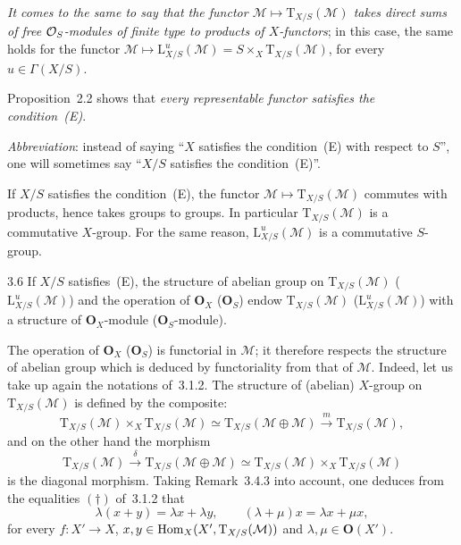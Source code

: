 \label{II.3.5.1}
\emph{It comes to the same to say that the functor
\(\mathcal{M}\mapsto\mathrm{T}_{X/S}(\mathcal{M})\) takes direct sums of free
\(\mathcal{O}_S\)-modules of finite type to products of \(X\)-functors};%
{\renewcommand{\thefootnote}{(23)}}
in this case, the same holds for the functor
\(\mathcal{M}\mapsto\mathrm{L}^{u}_{X/S}(\mathcal{M})
=S\times_X\mathrm{T}_{X/S}(\mathcal{M})\),
for every \(u\in\Gamma(X/S)\).

Proposition~2.2 shows that \emph{every representable functor satisfies the
condition~(E)}.

\emph{Abbreviation}: instead of saying ``\(X\) satisfies the condition~(E)
with respect to \(S\)'', one will sometimes say ``\(X/S\) satisfies the
condition~(E)''.

If \(X/S\) satisfies the condition~(E), the functor
\(\mathcal{M}\mapsto\mathrm{T}_{X/S}(\mathcal{M})\) commutes with products,
hence takes groups to groups. In particular
\(\mathrm{T}_{X/S}(\mathcal{M})\) is a commutative \(X\)-group. For the same
reason, \(\mathrm{L}^{u}_{X/S}(\mathcal{M})\) is a commutative \(S\)-group.

\begin{proposition}{3.6}
\label{II.3.6}
If \(X/S\) satisfies~(E), the structure of abelian group on
\(\mathrm{T}_{X/S}(\mathcal{M})\)
(\resp \(\mathrm{L}^{u}_{X/S}(\mathcal{M})\)) and the operation of
\(\mathbf{O}_X\) (\resp \(\mathbf{O}_S\)) endow
\(\mathrm{T}_{X/S}(\mathcal{M})\)
(\resp \(\mathrm{L}^{u}_{X/S}(\mathcal{M})\)) with a structure of
\(\mathbf{O}_X\)-module (\resp \(\mathbf{O}_S\)-module).
\end{proposition}

The operation of \(\mathbf{O}_X\) (\resp \(\mathbf{O}_S\)) is functorial in
\(\mathcal{M}\); it therefore respects the structure of abelian group which
is deduced by functoriality from that of \(\mathcal{M}\).%
{\renewcommand{\thefootnote}{(24)}}
Indeed, let us take up again the notations of~3.1.2. The structure of
(abelian) \(X\)-group on \(\mathrm{T}_{X/S}(\mathcal{M})\) is defined by the
composite:
\[
\mathrm{T}_{X/S}(\mathcal{M})\times_X\mathrm{T}_{X/S}(\mathcal{M})
\simeq
\mathrm{T}_{X/S}(\mathcal{M}\oplus\mathcal{M})
\xrightarrow{m}
\mathrm{T}_{X/S}(\mathcal{M}),
\]
and on the other hand the morphism
\[
\mathrm{T}_{X/S}(\mathcal{M})
\xrightarrow{\delta}
\mathrm{T}_{X/S}(\mathcal{M}\oplus\mathcal{M})
\simeq
\mathrm{T}_{X/S}(\mathcal{M})\times_X\mathrm{T}_{X/S}(\mathcal{M})
\]
is the diagonal morphism. Taking Remark~3.4.3 into account, one deduces from
the equalities \((\dagger)\) of~3.1.2 that
\[
\lambda(x+y)=\lambda x+\lambda y,\qquad (\lambda+\mu)x=\lambda x+\mu x,
\]
for every \(f\colon X'\to X\),
\(x,y\in\operatorname{Hom}_X(X',\mathrm{T}_{X/S}(\mathcal{M}))\) and
\(\lambda,\mu\in\mathbf{O}(X')\).

